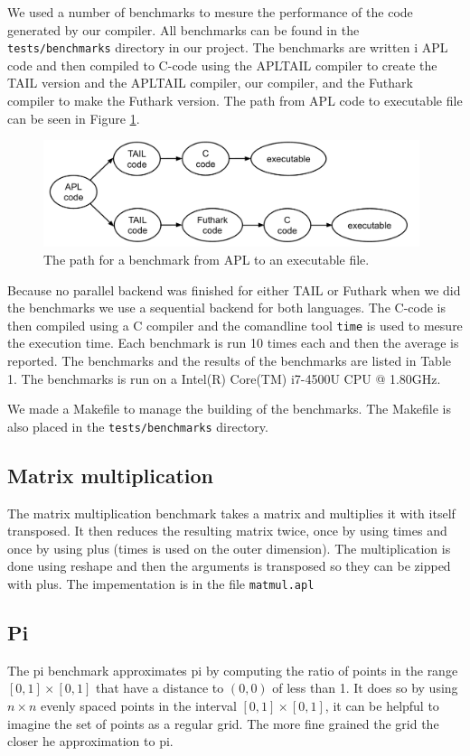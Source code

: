 \documentclass[11pt]{article}
\begin{document}
We used a number of benchmarks to mesure the performance of the code generated by our compiler. 
All benchmarks can be found in the {\tt tests/benchmarks} directory in our project. 
The benchmarks are written i APL code and then compiled to C-code using the APLTAIL compiler to create the TAIL version and the APLTAIL compiler, our compiler, and the Futhark compiler to make the Futhark version. The path from APL code to executable file can be seen in Figure \ref{fig:code}.

\begin{figure}[h]
\begin{center}
    \includegraphics[width=11cm]{code.png}
    \caption{The path for a benchmark from APL to an executable file.}
\end{center}
\label{fig:code}
\end{figure}

Because no parallel backend was finished for either TAIL or Futhark when we did the benchmarks we use a sequential backend for both languages. 
The C-code is then compiled using a C compiler and the comandline tool {\tt time} is used to mesure the execution time. Each benchmark is run 10 times each and then the average is reported. The benchmarks and the results of the benchmarks are listed in Table 1.
The benchmarks is run on a Intel(R) Core(TM) i7-4500U CPU @ 1.80GHz. 

We made a Makefile to manage the building of the benchmarks. The Makefile is also placed in the {\tt tests/benchmarks} directory.


\subsection{Matrix multiplication}
The matrix multiplication benchmark takes a matrix and multiplies it with itself transposed.
It then reduces the resulting matrix twice, once by using times and once by using plus (times is used on the outer dimension).
The multiplication is done using reshape and then the arguments is transposed so they can be zipped with plus.
The impementation is in the file {\tt matmul.apl}

\subsection{Pi}
The pi benchmark approximates pi by computing the ratio of points in the range $[0,1] \times [0,1]$ that have a distance to $(0,0)$ of less than 1.
It does so by using $n \times n$ evenly spaced points in the interval $[0,1] \times [0,1]$, it can be helpful to imagine the set of points as a regular grid.
The more fine grained the grid the closer he approximation to pi.
\end{document}
